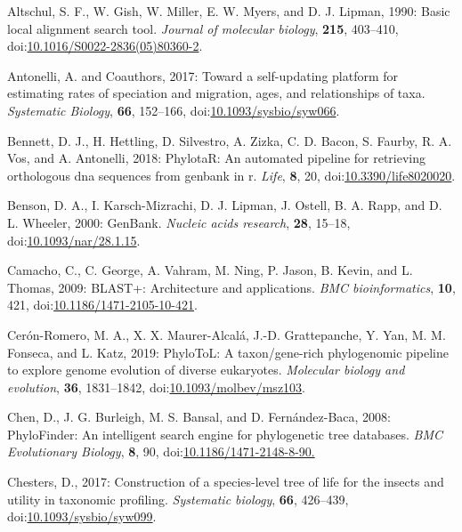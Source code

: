 \documentclass[draft]{ametsoc}
\begin{document}
\hypertarget{refs}{}
\leavevmode\hypertarget{ref-altschul1990basic}{}%
Altschul, S. F., W. Gish, W. Miller, E. W. Myers, and D. J. Lipman,
1990: Basic local alignment search tool. \emph{Journal of molecular
biology}, \textbf{215}, 403--410,
doi:\href{https://doi.org/10.1016/S0022-2836(05)80360-2}{10.1016/S0022-2836(05)80360-2}.

\leavevmode\hypertarget{ref-antonelli2017toward}{}%
Antonelli, A. and Coauthors, 2017: Toward a self-updating platform for
estimating rates of speciation and migration, ages, and relationships of
taxa. \emph{Systematic Biology}, \textbf{66}, 152--166,
doi:\href{https://doi.org/10.1093/sysbio/syw066}{10.1093/sysbio/syw066}.

\leavevmode\hypertarget{ref-bennett2018phylotar}{}%
Bennett, D. J., H. Hettling, D. Silvestro, A. Zizka, C. D. Bacon, S.
Faurby, R. A. Vos, and A. Antonelli, 2018: PhylotaR: An automated
pipeline for retrieving orthologous dna sequences from genbank in r.
\emph{Life}, \textbf{8}, 20,
doi:\href{https://doi.org/10.3390/life8020020}{10.3390/life8020020}.

\leavevmode\hypertarget{ref-benson2000genbank}{}%
Benson, D. A., I. Karsch-Mizrachi, D. J. Lipman, J. Ostell, B. A. Rapp,
and D. L. Wheeler, 2000: GenBank. \emph{Nucleic acids research},
\textbf{28}, 15--18,
doi:\href{https://doi.org/10.1093/nar/28.1.15}{10.1093/nar/28.1.15}.

\leavevmode\hypertarget{ref-camacho2009blast}{}%
Camacho, C., C. George, A. Vahram, M. Ning, P. Jason, B. Kevin, and L.
Thomas, 2009: BLAST+: Architecture and applications. \emph{BMC
bioinformatics}, \textbf{10}, 421,
doi:\href{https://doi.org/10.1186/1471-2105-10-421}{10.1186/1471-2105-10-421}.

\leavevmode\hypertarget{ref-ceron2019phylotol}{}%
Cerón-Romero, M. A., X. X. Maurer-Alcalá, J.-D. Grattepanche, Y. Yan, M.
M. Fonseca, and L. Katz, 2019: PhyloToL: A taxon/gene-rich phylogenomic
pipeline to explore genome evolution of diverse eukaryotes.
\emph{Molecular biology and evolution}, \textbf{36}, 1831--1842,
doi:\href{https://doi.org/10.1093/molbev/msz103}{10.1093/molbev/msz103}.

\leavevmode\hypertarget{ref-chen2008phylofinder}{}%
Chen, D., J. G. Burleigh, M. S. Bansal, and D. Fernández-Baca, 2008:
PhyloFinder: An intelligent search engine for phylogenetic tree
databases. \emph{BMC Evolutionary Biology}, \textbf{8}, 90,
doi:\href{https://doi.org/10.1186/1471-2148-8-90.}{10.1186/1471-2148-8-90.}

\leavevmode\hypertarget{ref-chesters2017construction}{}%
Chesters, D., 2017: Construction of a species-level tree of life for the
insects and utility in taxonomic profiling. \emph{Systematic biology},
\textbf{66}, 426--439,
doi:\href{https://doi.org/10.1093/sysbio/syw099}{10.1093/sysbio/syw099}.
\end{document}
